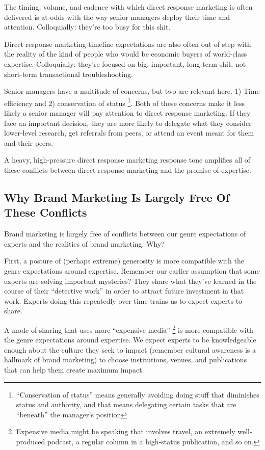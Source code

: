 \documentclass[13pt,]{tufte-handout}
\begin{document}
The timing, volume, and cadence with which direct response marketing is
often delivered is at odds with the way senior managers deploy their
time and attention. Colloquially: they're too busy for this shit.

Direct response marketing timeline expectations are also often out of
step with the reality of the kind of people who would be economic buyers
of world-class expertise. Colloquially: they're focused on big,
important, long-term shit, not short-term transactional troubleshooting.

Senior managers have a multitude of concerns, but two are relevant here.
1) Time efficiency and 2) conservation of status \footnote{``Conservation
  of status'' means generally avoiding doing stuff that diminishes
  status and authority, and that means delegating certain tasks that are
  ``beneath'' the manager's position}. Both of these concerns make it
less likely a senior manager will pay attention to direct response
marketing. If they face an important decision, they are more likely to
delegate what they consider lower-level research, get referrals from
peers, or attend an event meant for them and their peers.

A heavy, high-pressure direct response marketing response tone amplifies
all of these conflicts between direct response marketing and the promise
of expertise.

\hypertarget{why-brand-marketing-is-largely-free-of-these-conflicts}{%
\subsection{Why Brand Marketing Is Largely Free Of These
Conflicts}\label{why-brand-marketing-is-largely-free-of-these-conflicts}}

Brand marketing is largely free of conflicts between our genre
expectations of experts and the realities of brand marketing. Why?

First, a posture of (perhaps extreme) generosity is more compatible with
the genre expectations around expertise. Remember our earlier assumption
that some experts are solving important mysteries? They share what
they've learned in the course of their ``detective work'' in order to
attract future investment in that work. Experts doing this repeatedly
over time trains us to expect experts to share.

A mode of sharing that uses more ``expensive media'' \footnote{Expensive
  media might be speaking that involves travel, an extremely
  well-produced podcast, a regular column in a high-status publication,
  and so on.} is more compatible with the genre expectations around
expertise. We expect experts to be knowledgeable enough about the
culture they seek to impact (remember cultural awareness is a hallmark
of brand marketing) to choose institutions, venues, and publications
that can help them create maximum impact.
\end{document}
